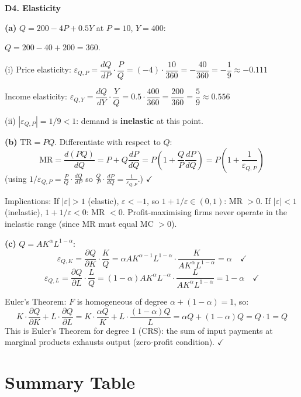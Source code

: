 \documentclass[12pt, a4paper]{article}
\theoremstyle{definition}
\newcommand{\ddd}[2]{\dfrac{d#1}{d#2}}
\newcommand{\pp}[2]{\dfrac{\partial #1}{\partial #2}}
\begin{document}
\begin{solbox}
\textbf{D4. Elasticity}

\textbf{(a)} $Q = 200-4P+0.5Y$ at $P=10$, $Y=400$:

$Q = 200-40+200 = 360$.

(i) Price elasticity:
$\varepsilon_{Q,P} = \ddd{Q}{P}\cdot\dfrac{P}{Q} = (-4)\cdot\dfrac{10}{360} = -\dfrac{40}{360} = -\dfrac{1}{9} \approx -0.111$

Income elasticity:
$\varepsilon_{Q,Y} = \ddd{Q}{Y}\cdot\dfrac{Y}{Q} = 0.5\cdot\dfrac{400}{360} = \dfrac{200}{360} = \dfrac{5}{9} \approx 0.556$

(ii) $|\varepsilon_{Q,P}| = 1/9 < 1$: demand is \textbf{inelastic} at this point.

\textbf{(b)} $\text{TR} = PQ$. Differentiate with respect to $Q$:
\[
  \text{MR} = \ddd{(PQ)}{Q} = P + Q\ddd{P}{Q}
             = P\!\left(1+\frac{Q}{P}\ddd{P}{Q}\right)
             = P\!\left(1+\frac{1}{\varepsilon_{Q,P}}\right)
\]
(using $1/\varepsilon_{Q,P} = \frac{P}{Q}\cdot\frac{dQ}{dP}$ so $\frac{Q}{P}\cdot\frac{dP}{dQ} = \frac{1}{\varepsilon_{Q,P}}$.) $\checkmark$

Implications: If $|\varepsilon|>1$ (elastic), $\varepsilon<-1$, so $1+1/\varepsilon\in(0,1)$: MR $>0$.
If $|\varepsilon|<1$ (inelastic), $1+1/\varepsilon<0$: MR $<0$.
Profit-maximising firms never operate in the inelastic range (since MR must equal MC $>0$).

\textbf{(c)} $Q = AK^\alpha L^{1-\alpha}$:
\[
  \varepsilon_{Q,K} = \pp{Q}{K}\cdot\frac{K}{Q}
  = \alpha AK^{\alpha-1}L^{1-\alpha}\cdot\frac{K}{AK^\alpha L^{1-\alpha}}
  = \alpha \quad\checkmark
\]
\[
  \varepsilon_{Q,L} = \pp{Q}{L}\cdot\frac{L}{Q}
  = (1-\alpha)AK^\alpha L^{-\alpha}\cdot\frac{L}{AK^\alpha L^{1-\alpha}}
  = 1-\alpha \quad\checkmark
\]

Euler's Theorem: $F$ is homogeneous of degree $\alpha+(1-\alpha)=1$, so:
\[
  K\cdot\pp{Q}{K} + L\cdot\pp{Q}{L}
  = K\cdot\frac{\alpha Q}{K} + L\cdot\frac{(1-\alpha)Q}{L}
  = \alpha Q + (1-\alpha)Q = Q \cdot 1 = Q
\]
This is Euler's Theorem for degree 1 (CRS): the sum of input payments at marginal products exhausts output (zero-profit condition). $\checkmark$
\end{solbox}

\section*{Summary Table}
\end{document}
